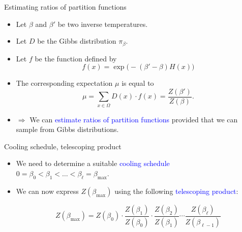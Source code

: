 \documentclass{beamer}
\renewcommand{\>}{\rangle}
\newcommand{\<}{\langle}
\begin{document}
%

\begin{frame}{Estimating ratios of partition functions}
    \begin{itemize}
        \item Let $\beta$ and $\beta'$ be two inverse temperatures.
        
        \medskip
        \item Let $D$ be the Gibbs distribution $\pi_\beta$.
        
        \medskip
        \item Let $f$ be the function defined by
        \begin{equation*}
            f(x) = \exp\big( -(\beta'-\beta) H(x)\big)
        \end{equation*}
        
        \medskip
        \item The corresponding expectation $\mu$ is equal to
        \begin{equation*}
            \mu = \sum_{x\in \Omega} D(x) \cdot f(x) =
            \frac{Z(\beta')}{Z(\beta)}.
        \end{equation*}
        
        \item $\Longrightarrow$ We can \textcolor{blue}{estimate ratios of partition functions} provided that we can sample from Gibbs distributions.
    \end{itemize}
\end{frame}

%

\begin{frame}{Cooling schedule, telescoping product}
    \begin{itemize}
        \item We need to determine a suitable \textcolor{blue}{cooling schedule} $0=\beta_0 < \beta_1 < \ldots < \beta_\ell = \beta_{\max}$.
        
        \bigskip
        \item We can now express $Z(\beta_{\max})$ using the following \textcolor{blue}{telescoping product}:
        
        \begin{equation*}
            Z(\beta_{\max}) = 
            Z(\beta_0) \cdot
            \frac{Z(\beta_1)}{Z(\beta_0)} \cdot
            \frac{Z(\beta_2)}{Z(\beta_1)}
            \cdots 
            \frac{Z(\beta_\ell)}{Z(\beta_{\ell-1})}
        \end{equation*}
    \end{itemize}
\end{frame}
\end{document}

